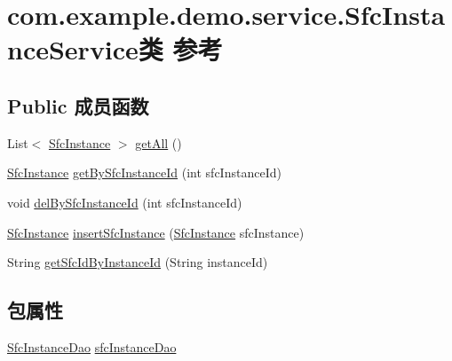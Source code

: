 \hypertarget{classcom_1_1example_1_1demo_1_1service_1_1_sfc_instance_service}{}\section{com.\+example.\+demo.\+service.\+Sfc\+Instance\+Service类 参考}
\label{classcom_1_1example_1_1demo_1_1service_1_1_sfc_instance_service}
\subsection*{Public 成员函数}
\begin{DoxyCompactItemize}
\item 
List$<$ \mbox{\hyperlink{classcom_1_1example_1_1demo_1_1modular_1_1_sfc_instance}{Sfc\+Instance}} $>$ \mbox{\hyperlink{classcom_1_1example_1_1demo_1_1service_1_1_sfc_instance_service_a0af1bc9f167fdbae8821ea39c83d7a2e}{get\+All}} ()
\item 
\mbox{\hyperlink{classcom_1_1example_1_1demo_1_1modular_1_1_sfc_instance}{Sfc\+Instance}} \mbox{\hyperlink{classcom_1_1example_1_1demo_1_1service_1_1_sfc_instance_service_a233a3a0d1d2cccbf9c10a98670cea846}{get\+By\+Sfc\+Instance\+Id}} (int sfc\+Instance\+Id)
\item 
void \mbox{\hyperlink{classcom_1_1example_1_1demo_1_1service_1_1_sfc_instance_service_a02f2c77a295888dd4e4f7ff2b75088b1}{del\+By\+Sfc\+Instance\+Id}} (int sfc\+Instance\+Id)
\item 
\mbox{\hyperlink{classcom_1_1example_1_1demo_1_1modular_1_1_sfc_instance}{Sfc\+Instance}} \mbox{\hyperlink{classcom_1_1example_1_1demo_1_1service_1_1_sfc_instance_service_a18437d74fb93877d4736991c3295c666}{insert\+Sfc\+Instance}} (\mbox{\hyperlink{classcom_1_1example_1_1demo_1_1modular_1_1_sfc_instance}{Sfc\+Instance}} sfc\+Instance)
\item 
String \mbox{\hyperlink{classcom_1_1example_1_1demo_1_1service_1_1_sfc_instance_service_a18f4f9a1143133240572791238b75d74}{get\+Sfc\+Id\+By\+Instance\+Id}} (String instance\+Id)
\end{DoxyCompactItemize}
\subsection*{包属性}
\begin{DoxyCompactItemize}
\item 
\mbox{\hyperlink{interfacecom_1_1example_1_1demo_1_1dao_1_1_sfc_instance_dao}{Sfc\+Instance\+Dao}} \mbox{\hyperlink{classcom_1_1example_1_1demo_1_1service_1_1_sfc_instance_service_ad05557427729d08d1803c00f348db854}{sfc\+Instance\+Dao}}
\end{DoxyCompactItemize}


